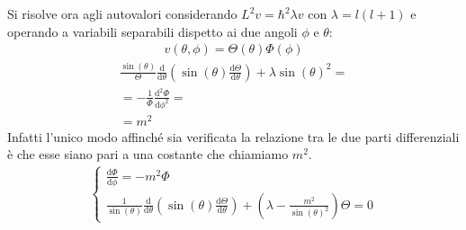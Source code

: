 Si risolve ora agli autovalori considerando $L^2v=\hbar ^2\lambda v$ con $\lambda=l\left(l+1\right)$ e operando a variabili separabili dispetto ai due angoli $\phi$ e $\theta$:
\begin{equation}\begin{split}
v\left(\theta,\phi\right)=\Theta\left(\theta\right)\Phi\left(\phi\right)
\end{split}\end{equation}
\begin{equation}\begin{split}
\frac{\sin{\left(\theta\right)}}{\Theta}\frac{\textrm{d}}{\textrm{d}\theta}\left(\sin{\left(\theta\right)}\frac{\textrm{d}\Theta}{\textrm{d}\theta}\right)+\lambda\sin{\left(\theta\right)}^2=\\
=-\frac{1}{\Phi}\frac{\textrm{d}^2\Phi}{\textrm{d}\phi^2}=\\
=m^2
\end{split}\end{equation}
Infatti l'unico modo affinché sia verificata la relazione tra le due parti differenziali è che esse siano pari a una costante che chiamiamo $m^2$. 
\begin{equation}\begin{split}
\begin{cases}
\frac{\textrm{d}\Phi}{\textrm{d}\phi}=-m^2\Phi \\
\frac{1}{\sin{\left(\theta\right)}}\frac{\textrm{d}}{\textrm{d}\theta}\left(\sin{\left(\theta\right)}\frac{\textrm{d}\Theta}{\textrm{d}\theta}\right)+\left(\lambda-\frac{m^2}{\sin{\left(\theta\right)}^2}\right)\Theta=0
\end{cases}
\end{split}\end{equation}

